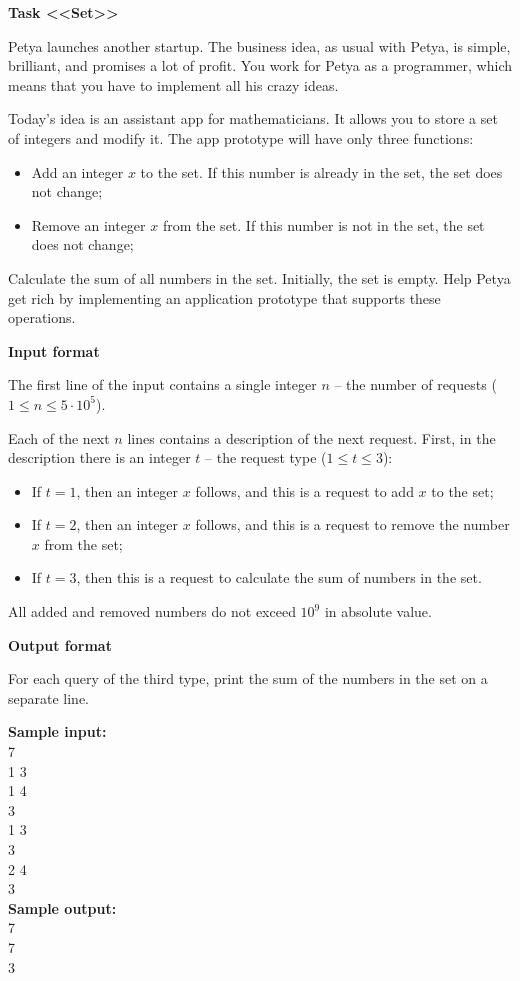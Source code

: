 \documentclass[a4paper]{article}
\begin{document}
\textbf{Task <<Set>>}

Petya launches another startup. The business idea, as usual with Petya, is simple, brilliant, and promises a lot of profit. You work for Petya as a programmer, which means that you have to implement all his crazy ideas.

Today's idea is an assistant app for mathematicians. It allows you to store a set of integers and modify it. The app prototype will have only three functions:
\begin{itemize}
\item Add an integer $x$ to the set. If this number is already in the set, the set does not change;
\item Remove an integer $x$ from the set. If this number is not in the set, the set does not change;
\end{itemize}

Calculate the sum of all numbers in the set. Initially, the set is empty. Help Petya get rich by implementing an application prototype that supports these operations.

\SPACE

\textbf{Input format}

The first line of the input contains a single integer $n$ -- the number of requests ($1 \le n \le 5 \cdot 10^5$).

Each of the next $n$ lines contains a description of the next request. First, in the description there is an integer $t$ -- the request type ($1 \le t \le 3$):
\begin{itemize}
\item If $t = 1$, then an integer $x$ follows, and this is a request to add $x$ to the set;
\item If $t = 2$, then an integer $x$ follows, and this is a request to remove the number $x$ from the set;
\item If $t = 3$, then this is a request to calculate the sum of numbers in the set.
\end{itemize}

All added and removed numbers do not exceed $10^9$ in absolute value.

\SPACE

\textbf{Output format}

For each query of the third type, print the sum of the numbers in the set on a separate line.

\LINE

\noindent \textbf{Sample input:}\\
7\\
1 3\\
1 4\\
3\\
1 3\\
3\\
2 4\\
3\\

\noindent \textbf{Sample output:}\\
7\\
7\\
3\\
\end{document}
